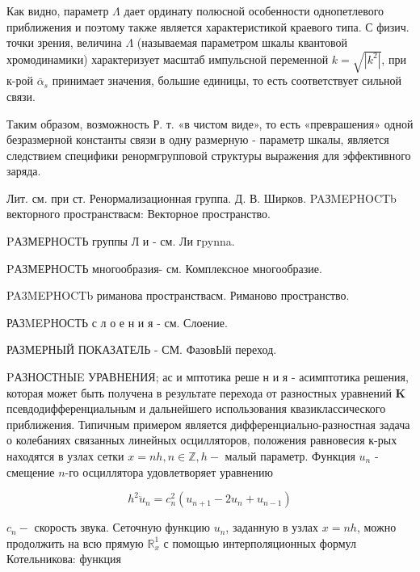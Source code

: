 \documentclass[10pt]{article}
\begin{document}
Как видно, параметр $\Lambda$ дает ординату полюсной особенности однопетлевого приближения и поэтому также является характеристикой краевого типа. С физич. точки зрения, величина $\Lambda$ (называемая параметром шкалы квантовой хромодинамики) характеризует масштаб импульсной переменной $k=\sqrt{\left|k^{2}\right|}$, при к-рой $\bar{\alpha}_{s}$ принимает значения, большие единицы, то есть соответствует сильной связи.



Таким образом, возможность Р. т. «в чистом виде», то есть «преврашения» одной безразмерной константы связи в одну размерную - параметр шкалы, является следствием специфики ренормгрупповой структуры выражения для эффективного заряда.



Лит. см. при ст. Ренормализационная группа. Д. В. Ширков. PAЗMEPHOCTb векторного пространствасм: Векторное пространство.



PАЗМЕРНОСТЬ группы Л и - см. Ли гpynna.



PАЗМЕРНОСТЬ многообразия- см. Комплексное многообразие.



PA3MEPHOCTb риманова пространствасм. Риманово пространство.



РАЗMEPНОСТЬ с л о е н и я - см. Слоение.



РАЗМЕРНЫЙ ПОКАЗАТЕЛЬ - СМ. ФазовЫй переход.



PАЗНОСТНЫE УРАВНЕНИЯ; ас и мптотика реше н и я - асимптотика решения, которая может быть получена в результате перехода от разностных уравнений $\mathbf{K}$ псевдодифференциальным и дальнейшего использования квазиклассического приближения. Типичным примером является дифференциально-разностная задача о колебаниях связанных линейных осцилляторов, положения равновесия к-рых находятся в узлах сетки $x=n h, n \in \mathbb{Z}, h-$ малый параметр. Функция $u_{n}$ - смещение $n$-го осциллятора удовлетворяет уравнению



\[

h^{2} \ddot{u}_{n}=c_{n}^{2}\left(u_{n+1}-2 u_{n}+u_{n-1}\right)

\]



$c_{n}-$ скорость звука. Сеточную функцию $u_{n}$, заданную в узлах $x=n h$, можно продолжить на всю прямую $\mathbb{R}_{x}^{1}$ с помощью интерполяционных формул Котельникова: функция
\end{document}
